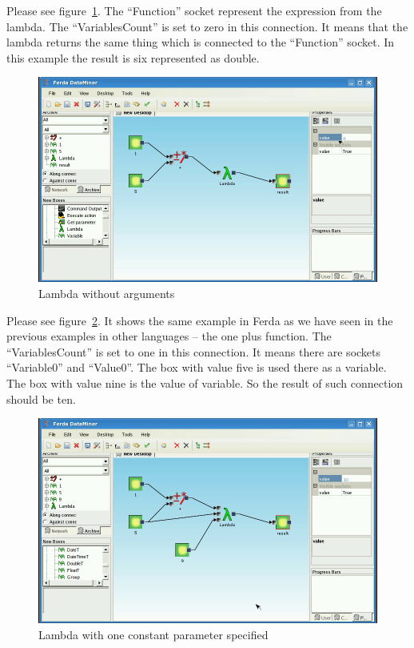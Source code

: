 \documentclass[a4paper,12pt]{book}
\begin{document}
Please see figure~\ref{fig:boxLambdaBasic}. The ``Function'' socket represent the expression from the lambda. The ``VariablesCount'' is set to zero in this connection. It means that the lambda returns the same thing which is connected to the ``Function'' socket. In this example the result is six represented as double. 
\begin{figure}
	\includegraphics[width=1\textwidth]{lambdaBasic2.png}
	\caption{Lambda without arguments}
	\label{fig:boxLambdaBasic}
\end{figure}

Please see figure~\ref{fig:boxLambdaOnePlus}. It shows the same example in Ferda as we have seen in the previous examples in other languages -- the one plus function. The ``VariablesCount'' is set to one in this connection. It means there are sockets ``Variable0'' and ``Value0''. The box with value five is used there as a variable. The box with value nine is the value of variable. So the result of such connection should be ten.
\begin{figure}
	\includegraphics[width=1\textwidth]{lambdaBasic3.png}
	\caption{Lambda with one constant parameter specified}
	\label{fig:boxLambdaOnePlus}
\end{figure}
\end{document}
